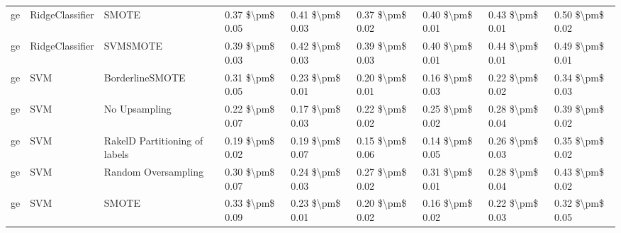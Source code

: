 \begin{tabular}{lllllllll}
      ge &                 RidgeClassifier &                         SMOTE & 0.37 \$\textbackslash pm\$ 0.05 &           0.41 \$\textbackslash pm\$ 0.03 &       0.37 \$\textbackslash pm\$ 0.02 &        0.40 \$\textbackslash pm\$ 0.01 &                         0.43 \$\textbackslash pm\$ 0.01 &     0.50 \$\textbackslash pm\$ 0.02 \\
      ge &                 RidgeClassifier &                      SVMSMOTE & 0.39 \$\textbackslash pm\$ 0.03 &           0.42 \$\textbackslash pm\$ 0.03 &       0.39 \$\textbackslash pm\$ 0.03 &        0.40 \$\textbackslash pm\$ 0.01 &                         0.44 \$\textbackslash pm\$ 0.01 &     0.49 \$\textbackslash pm\$ 0.01 \\
      ge &                             SVM &               BorderlineSMOTE & 0.31 \$\textbackslash pm\$ 0.05 &           0.23 \$\textbackslash pm\$ 0.01 &       0.20 \$\textbackslash pm\$ 0.01 &        0.16 \$\textbackslash pm\$ 0.03 &                         0.22 \$\textbackslash pm\$ 0.02 &     0.34 \$\textbackslash pm\$ 0.03 \\
      ge &                             SVM &                 No Upsampling & 0.22 \$\textbackslash pm\$ 0.07 &           0.17 \$\textbackslash pm\$ 0.03 &       0.22 \$\textbackslash pm\$ 0.02 &        0.25 \$\textbackslash pm\$ 0.02 &                         0.28 \$\textbackslash pm\$ 0.04 &     0.39 \$\textbackslash pm\$ 0.02 \\
      ge &                             SVM & RakelD Partitioning of labels & 0.19 \$\textbackslash pm\$ 0.02 &           0.19 \$\textbackslash pm\$ 0.07 &       0.15 \$\textbackslash pm\$ 0.06 &        0.14 \$\textbackslash pm\$ 0.05 &                         0.26 \$\textbackslash pm\$ 0.03 &     0.35 \$\textbackslash pm\$ 0.02 \\
      ge &                             SVM &           Random Oversampling & 0.30 \$\textbackslash pm\$ 0.07 &           0.24 \$\textbackslash pm\$ 0.03 &       0.27 \$\textbackslash pm\$ 0.02 &        0.31 \$\textbackslash pm\$ 0.01 &                         0.28 \$\textbackslash pm\$ 0.04 &     0.43 \$\textbackslash pm\$ 0.02 \\
      ge &                             SVM &                         SMOTE & 0.33 \$\textbackslash pm\$ 0.09 &           0.23 \$\textbackslash pm\$ 0.01 &       0.20 \$\textbackslash pm\$ 0.02 &        0.16 \$\textbackslash pm\$ 0.02 &                         0.22 \$\textbackslash pm\$ 0.03 &     0.32 \$\textbackslash pm\$ 0.05 \\

\end{tabular}
